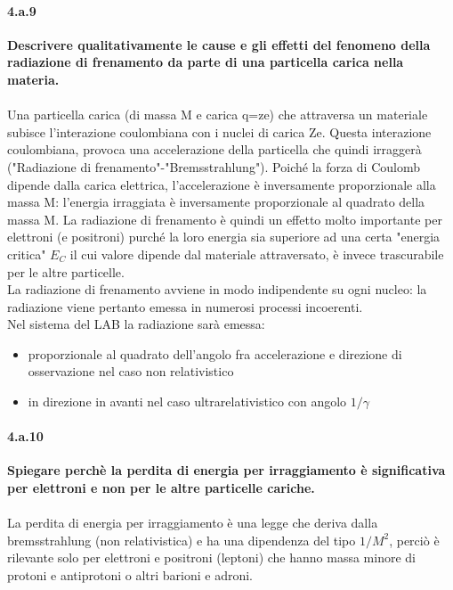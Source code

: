 \documentclass[twoside]{article}
\begin{document}
\paragraph{4.a.9}\textbf{Descrivere qualitativamente le cause e gli effetti del fenomeno della radiazione di frenamento da parte di una particella carica nella materia.}\\
\\
Una particella carica (di massa M e carica q=ze) che attraversa un materiale subisce l'interazione coulombiana con i nuclei di carica Ze. Questa interazione coulombiana, provoca una accelerazione della particella che quindi irraggerà ("Radiazione di frenamento"-"Bremsstrahlung"). Poiché la forza di Coulomb dipende dalla carica elettrica, l'accelerazione è inversamente proporzionale alla massa M: l'energia irraggiata è inversamente proporzionale al quadrato della massa M. La radiazione di frenamento è quindi un effetto molto importante per elettroni (e positroni) purché la loro energia sia superiore ad una certa "energia critica" $E_C$ il cui valore dipende dal materiale attraversato, è invece trascurabile per le altre particelle.\\
La radiazione di frenamento avviene in modo indipendente su ogni nucleo: la radiazione viene pertanto emessa in numerosi processi incoerenti.\\
Nel sistema del LAB la radiazione sarà emessa:
\begin{itemize}
    \item proporzionale al quadrato dell'angolo fra accelerazione e direzione di osservazione nel caso non relativistico
    \item in direzione in avanti nel caso ultrarelativistico con angolo $1/\gamma$
\end{itemize}

\paragraph{4.a.10}\textbf{Spiegare perchè la perdita di energia per irraggiamento è significativa per
elettroni e non per le altre particelle cariche. 
}\\ \\

La perdita di energia per irraggiamento è una legge che deriva dalla bremsstrahlung (non relativistica) e ha una dipendenza del tipo $1/M^2$, perciò è rilevante solo per elettroni e positroni (leptoni) che hanno massa minore di protoni e antiprotoni o altri barioni e adroni.
\end{document}
